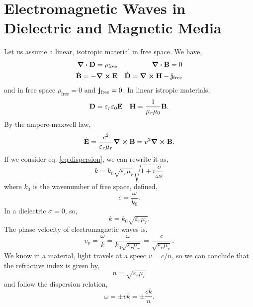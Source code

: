 \documentclass{book}
\begin{document}
\section{Electromagnetic Waves in Dielectric and Magnetic Media}
Let us assume a linear, isotropic material in free space. We have,
\begin{align}
	\div{\vb{D}} = \rho_{\text{free}} && \div{\vb{B}} = 0 \\
	\Dot{\vb{B}} = - \curl{\vb{E}} && \Dot{\vb{D}} = \curl{\vb{H}} - \vb{j}_{\text{free}}
\end{align}
and in free space $\rho_{\text{free}} = 0$ and $\vb{j}_{\text{free}} = 0$. In linear istropic materials,
\begin{align}
	\vb{D} = \varepsilon_r \varepsilon_0  \vb{E} && \vb{H}= \frac{1}{\mu_r\mu_0}\vb{B}.
\end{align}
By the ampere-maxwell law,
\begin{equation}
	\Dot{\vb{E}} = \frac{c^2}{\varepsilon_r\mu_r}\curl{\vb{B}} = v^2 \curl{\vb{B}}.
\end{equation}
If we consider eq. \eqref{eq:dispersion}, we can rewrite it as,
\begin{equation}
	k = k_0 \sqrt{\varepsilon_r\mu_r}\sqrt{1 + i\frac{\sigma}{\omega \varepsilon}}
\end{equation}
where $k_0$ is the wavenumber of free space, defined,
\begin{equation}
	c = \frac{\omega}{k_0}.
\end{equation}
In a dielectric $\sigma =0$, so,
\begin{equation}
	k = k_0 \sqrt{\varepsilon_r \mu_r}.
\end{equation}
The phase velocity of electromagnetic waves is,
\begin{equation}
	v_p = \frac{\omega}{k} = \frac{\omega}{k_0\sqrt{\varepsilon_r\mu_r}} = \frac{c}{\sqrt{\varepsilon_r\mu_r}}.
\end{equation}
We know in a material, light travels at a speec $v = c/n$, so we can conclude that the refractive index is given by,
\begin{equation}
	\boxed{n = \sqrt{\varepsilon_r\mu_r}}
\end{equation}
and follow the dispersion relation,
\begin{equation}
	\boxed{\omega = \pm vk = \pm \frac{ck}{n}}.
\end{equation}
\end{document}
